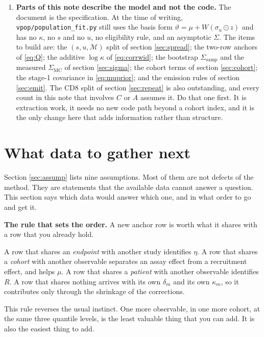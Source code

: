 \documentclass[11pt]{article}
\newcommand{\Mset}{\mathcal{M}}
\begin{document}
\begin{enumerate}[label=(\roman*)]
\item \textbf{Parts of this note describe the model and not the code.} The
document is the specification. At the time of writing,
\texttt{vpop/population\_fit.py} still uses the basis form
$\vartheta=\mu+W(\sigma_u\odot z)$ and has no $\kappa$, no $s$ and no $u$, no
eligibility rule, and an asymptotic $\Sigma$. The items to build are: the
$(s,u,\Mset)$ split of section \ref{sec:spread}; the two-row anchors of
\eqref{eq:Q}; the additive $\log\kappa$ of \eqref{eq:corrwid}; the bootstrap
$\Sigma_{\text{samp}}$ and the measured $\Sigma_{\text{MC}}$ of section
\ref{sec:sigma}; the cohort terms of section \ref{sec:cohort}; the stage-1
covariance in \eqref{eq:muprior}; and the emission rules of section
\ref{sec:emit}. The CD8 split of section \ref{sec:repeat} is also outstanding,
and every count in this note that involves $C$ or $A$ assumes it. Do that one
first. It is extraction work, it needs no new code path beyond a cohort index,
and it is the only change here that adds information rather than structure.
\end{enumerate}

\section{What data to gather next}
\label{sec:data}

Section \ref{sec:assump} lists nine assumptions. Most of them are not defects of
the method. They are statements that the available data cannot answer a
question. This section says which data would answer which one, and in what
order to go and get it.

\begin{notebox}
\textbf{The rule that sets the order.} A new anchor row is worth what it shares
with a row that you already hold.

A row that shares an \emph{endpoint} with another study identifies $\eta$. A row
that shares a \emph{cohort} with another observable separates an assay effect
from a recruitment effect, and helps $\mu$. A row that shares a \emph{patient}
with another observable identifies $R$. A row that shares nothing arrives with
its own $\delta_m$ and its own $\kappa_m$, so it contributes only through the
shrinkage of the corrections.

This rule reverses the usual instinct. One more observable, in one more cohort,
at the same three quantile levels, is the least valuable thing that you can add.
It is also the easiest thing to add.
\end{notebox}
\end{document}
